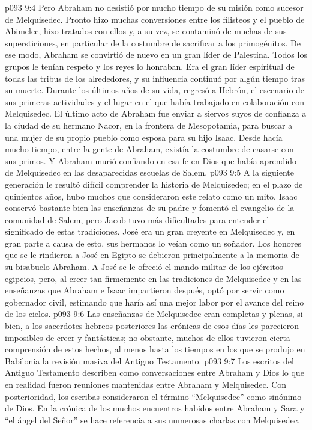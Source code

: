 \vs p093 9:4 Pero Abraham no desistió por mucho tiempo de su misión como sucesor de Melquisedec. Pronto hizo muchas conversiones entre los filisteos y el pueblo de Abimelec, hizo tratados con ellos y, a su vez, se contaminó de muchas de sus supersticiones, en particular de la costumbre de sacrificar a los primogénitos. De ese modo, Abraham se convirtió de nuevo en un gran líder de Palestina. Todos los grupos le tenían respeto y los reyes lo honraban. Era el gran líder espiritual de todas las tribus de los alrededores, y su influencia continuó por algún tiempo tras su muerte. Durante los últimos años de su vida, regresó a Hebrón, el escenario de sus primeras actividades y el lugar en el que había trabajado en colaboración con Melquisedec. El último acto de Abraham fue enviar a siervos suyos de confianza a la ciudad de su hermano Nacor, en la frontera de Mesopotamia, para buscar a una mujer de su propio pueblo como esposa para su hijo Isaac. Desde hacía mucho tiempo, entre la gente de Abraham, existía la costumbre de casarse con sus primos. Y Abraham murió confiando en esa fe en Dios que había aprendido de Melquisedec en las desaparecidas escuelas de Salem.
\vs p093 9:5 \pc A la siguiente generación le resultó difícil comprender la historia de Melquisedec; en el plazo de quinientos años, hubo muchos que consideraron este relato como un mito. Isaac conservó bastante bien las enseñanzas de su padre y fomentó el evangelio de la comunidad de Salem, pero Jacob tuvo más dificultades para entender el significado de estas tradiciones. José era un gran creyente en Melquisedec y, en gran parte a causa de esto, sus hermanos lo veían como un soñador. Los honores que se le rindieron a José en Egipto se debieron principalmente a la memoria de su bisabuelo Abraham. A José se le ofreció el mando militar de los ejércitos egipcios, pero, al creer tan firmemente en las tradiciones de Melquisedec y en las enseñanzas que Abraham e Isaac impartieron después, optó por servir como gobernador civil, estimando que haría así una mejor labor por el avance del reino de los cielos.
\vs p093 9:6 Las enseñanzas de Melquisedec eran completas y plenas, si bien, a los sacerdotes hebreos posteriores las crónicas de esos días les parecieron imposibles de creer y fantásticas; no obstante, muchos de ellos tuvieron cierta comprensión de estos hechos, al menos hasta los tiempos en los que se produjo en Babilonia la revisión masiva del Antiguo Testamento.
\vs p093 9:7 Los escritos del Antiguo Testamento describen como conversaciones entre Abraham y Dios lo que en realidad fueron reuniones mantenidas entre Abraham y Melquisedec. Con posterioridad, los escribas consideraron el término “Melquisedec” como sinónimo de Dios. En la crónica de los muchos encuentros habidos entre Abraham y Sara y “el ángel del Señor” se hace referencia a sus numerosas charlas con Melquisedec.
